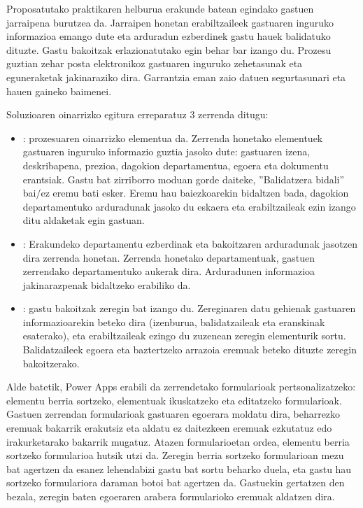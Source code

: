 Proposatutako praktikaren helburua erakunde batean egindako gastuen jarraipena burutzea da. Jarraipen honetan erabiltzaileek gastuaren inguruko
informazioa emango dute eta arduradun ezberdinek gastu hauek balidatuko dituzte. Gastu bakoitzak erlazionatutako egin behar bar izango du.
Prozesu guztian zehar posta elektronikoz gastuaren inguruko zehetasunak eta eguneraketak jakinaraziko dira. Garrantzia eman zaio datuen segurtasunari eta hauen gaineko baimenei. 

Soluzioaren oinarrizko egitura erreparatuz 3 zerrenda ditugu:

\begin{itemize}
  \item {}: prozesuaren oinarrizko elementua da. Zerrenda honetako elementuek gastuaren inguruko informazio guztia jasoko
  dute: gastuaren izena, deskribapena, prezioa, dagokion departamentua, egoera eta dokumentu erantsiak. Gastu bat zirriborro moduan gorde daiteke,
  ''Balidatzera bidali'' bai/ez eremu bati esker. Eremu hau baiezkoarekin bidaltzen bada, dagokion departamentuko arduradunak jasoko du
  eskaera eta erabiltzaileak ezin izango ditu aldaketak egin gastuan.
  \item {}: Erakundeko departamentu ezberdinak eta bakoitzaren arduradunak jasotzen dira zerrenda honetan. Zerrenda
  honetako departamentuak, gastuen zerrendako departamentuko aukerak dira. Arduradunen informazioa jakinarazpenak bidaltzeko erabiliko da.
  \item {}: gastu bakoitzak zeregin bat izango du. Zereginaren datu gehienak gastuaren informazioarekin beteko dira (izenburua,
  balidatzaileak eta eranskinak esaterako), eta erabiltzaileak ezingo du zuzenean zeregin elementurik sortu. Balidatzaileek egoera eta
  baztertzeko arrazoia eremuak beteko dituzte zeregin bakoitzerako.
\end{itemize}

Alde batetik, Power Apps erabili da zerrendetako formularioak pertsonalizatzeko: elementu berria sortzeko, elementuak ikuskatzeko eta
editatzeko formularioak. Gastuen zerrendan formularioak gastuaren egoerara moldatu dira, beharrezko eremuak bakarrik erakutsiz eta aldatu ez daitezkeen
eremuak ezkutatuz edo irakurketarako bakarrik mugatuz. Atazen formularioetan ordea, elementu berria sortzeko formularioa hutsik utzi da. Zeregin berria
sortzeko formularioan mezu bat agertzen da esanez lehendabizi gastu bat sortu beharko duela, eta gastu hau sortzeko formulariora daraman botoi bat
agertzen da. Gastuekin gertatzen den bezala, zeregin baten egoeraren arabera formularioko eremuak aldatzen dira.

